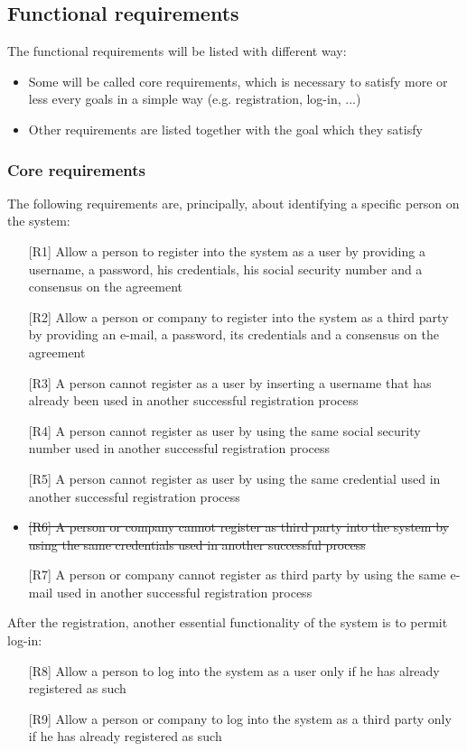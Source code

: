 \subsection{Functional requirements}
\par
The functional requirements will be listed with different way:
\begin{itemize}
\item Some will be called core requirements, which is necessary to satisfy more or less every goals in a simple way (e.g. registration, log-in, ...)
\item Other requirements are listed together with the goal which they satisfy
\end{itemize}

\subsubsection{Core requirements}
\par
The following requirements are, principally, about identifying a specific person on the system:
\begin{itemize}
\item[{[R1]}] Allow a person to register into the system as a user by providing a username, a password, his credentials, his social security number and a consensus on the agreement
\item[{[R2]}] Allow a person or company to register into the system as a third party by providing an e-mail, a password, its credentials and a consensus on the agreement
\item[{[R3]}] A person cannot register as a user by inserting a username that has already been used in another successful registration process
\item[{[R4]}] A person cannot register as user by using the same social security number used in another successful registration process 
\item[{[R5]}] A person cannot register as user by using the same credential used in another successful registration process 
\item \st{[R6] A person or company cannot register as third party into the system by using the same credentials used in another successful process}
\item[{[R7]}] A person or company cannot register as third party by using the same e-mail used in another successful registration process
\end{itemize}
\par
After the registration, another essential functionality of the system is to permit log-in:
\begin{itemize}
\item[{[R8]}] Allow a person to log into the system as a user only if he has already registered as such
\item[{[R9]}] Allow a person or company to log into the system as a third party only if he has already registered as such
\end{itemize}

